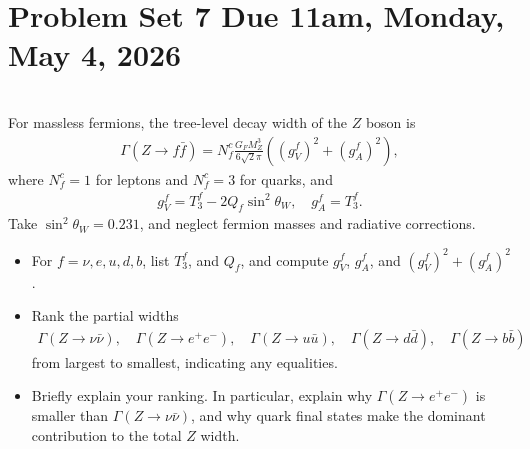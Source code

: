 \section*{Problem Set 7 Due 11am, Monday, May 4, 2026}

\\
For massless fermions, the tree-level decay width of the $Z$ boson is
\begin{align}
    \Gamma(Z \to f \bar{f}) = N_f^c \frac{G_F M_Z^3}{6\sqrt{2}\pi} \left((g_V^f)^2 + (g_A^f)^2\right),
\end{align}
where $N_f^c=1$ for leptons and $N_f^c=3$ for quarks, and 
\begin{align}
    g_V^f = T_3^f - 2 Q_f \sin^2\theta_W, \quad g_A^f = T_3^f.
\end{align}
Take $\sin^2\theta_W = 0.231$, and neglect fermion masses and radiative corrections.

\begin{itemize}
    \item [(a)] For $f=\nu, e, u, d, b$, list $T_3^f$, and $Q_f$, and compute $g_V^f$, $g_A^f$, and $(g_V^f)^2 + (g_A^f)^2$.
    \item [(b)] Rank the partial widths 
    \begin{align}
        \Gamma(Z \to \nu \bar{\nu}), \quad \Gamma(Z \to e^+ e^-), \quad \Gamma(Z \to u \bar{u}), \quad \Gamma(Z \to d \bar{d}), \quad \Gamma(Z \to b \bar{b})
    \end{align}
    from largest to smallest, indicating any equalities.
    \item [(c)] Briefly explain your ranking. In particular, explain why $\Gamma(Z \to e^+ e^-)$ is smaller than $\Gamma(Z \to \nu \bar{\nu})$, and why quark final states make the dominant contribution to the total $Z$ width.
\end{itemize}

